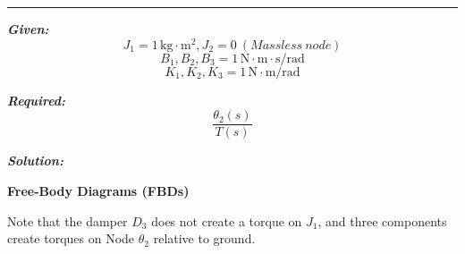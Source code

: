 \documentclass[11pt]{article}
\begin{document}
\noindent\rule{\textwidth}{1pt}

\vspace{12pt}


\noindent\textbf{\textit{Given:}}
\[
J_1 = 1\, \text{kg}\cdot\text{m}^2, J_2 = 0 \ (Mass less\ node)
\]
\[
B_1,B_2,B_3 = 1\, \text{N}\cdot\text{m}\cdot\text{s/rad} 
\]
\[
K_1,K_2,K_3 = 1\, \text{N}\cdot\text{m/rad} 
\]

\vspace{1em}
\noindent

\noindent\textbf{\textit{Required:}}
\[
\frac{\theta_2(s)}{T(s)}
\]

\vspace{1.5em}
\noindent\textbf{\textit{Solution:}}

\vspace{8pt}

\noindent\textbf{Free-Body Diagrams (FBDs)}
\vspace{8pt}

\noindent  Note that the damper $D_{3}$ does not create a torque on $J_1$, and three components create torques on Node $\theta_2$ relative to ground.
\end{document}
